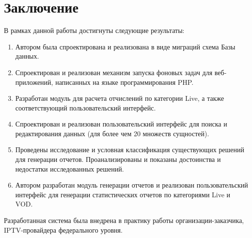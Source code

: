 \section*{Заключение}

В рамках данной работы достигнуты следующие результаты:

\begin{enumerate}
\item {
Автором была спроектирована и реализована в виде миграций схема
Базы данных.
}
\item {
Спроектирован и реализован механизм запуска фоновых задач для веб-приложений, написанных
на языке программирования PHP.
}
\item {
Разработан модуль для расчета отчислений по категории Live, а также соответствующий
пользовательский интерфейс. 
}
\item {
Спроектирован и реализован пользовательский интерфейс для поиска
и редактирования данных (для более чем 20 множеств сущностей).
}
\item {
Проведены исследование и условная классификация существующих 
решений для генерации отчетов. 
Проанализированы и показаны достоинства и недостатки исследованных решений.
}
\item {
Автором разработан модуль генерации отчетов и реализован
пользовательский интерфейс для генерации статистических отчетов
по категориями Live и VOD.
}
\end{enumerate}

Разработанная система была внедрена в практику работы организации-заказчика,
IPTV-провайдера федерального уровня.
